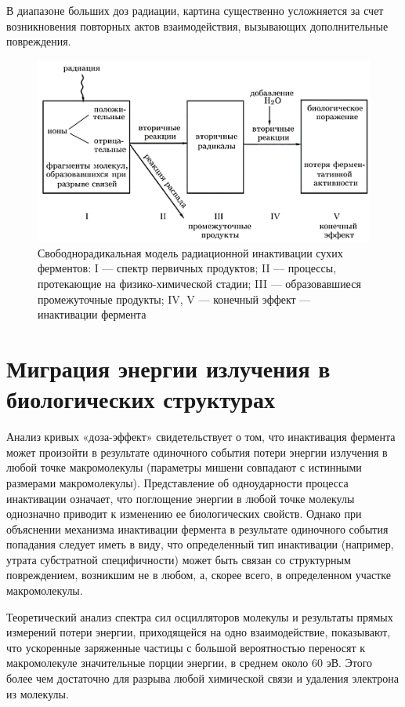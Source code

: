 \documentclass[a4paper, 14pt]{article}
\begin{document}
В диапазоне больших доз радиации, картина существенно усложняется за счет
возникновения повторных актов взаимодействия, вызывающих дополнительные
повреждения.
\begin{figure}[htbp]
    \centering
    \includegraphics[width=\textwidth]{radInacModel.png}
    \caption{Свободнорадикальная модель радиационной инактивации сухих ферментов: I — спектр первичных продуктов; II — процессы, протекающие на физико-химической стадии; III — образовавшиеся промежуточные продукты; IV, V — конечный эффект — инактивации фермента}
    \label{radInacModel}
\end{figure}

\section{Миграция энергии излучения в биологических структурах}
Анализ кривых «доза-эффект» свидетельствует о том, что инактивация фермента
может произойти в результате одиночного события потери энергии излучения в любой
точке макромолекулы (параметры мишени совпадают с истинными размерами
макромолекулы). Представление об одноударности процесса инактивации означает,
что поглощение энергии в любой точке молекулы однозначно приводит к изменению
ее биологических свойств. Однако при объяснении механизма инактивации фермента
в результате одиночного события попадания следует иметь в виду, что определенный
тип инактивации (например, утрата субстратной специфичности) может быть связан
со структурным повреждением, возникшим не в любом, а, скорее всего, в
определенном участке макромолекулы.

Теоретический анализ спектра сил осцилляторов молекулы и результаты прямых
измерений потери энергии, приходящейся на одно взаимодействие, показывают, что
ускоренные заряженные частицы с большой вероятностью переносят к макромолекуле
значительные порции энергии, в среднем около 60 эВ. Этого более чем достаточно для
разрыва любой химической связи и удаления электрона из молекулы.
\end{document}
